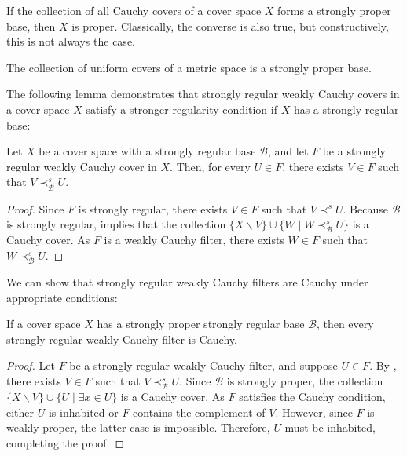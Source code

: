 \documentclass[reqno]{amsart}
\theoremstyle{definition}
\theoremstyle{remark}
\numberwithin{figure}{section}
\newcommand{\rb}{\prec}
\begin{document}
\begin{remark}
If the collection of all Cauchy covers of a cover space $X$ forms a strongly proper base, then $X$ is proper.
Classically, the converse is also true, but constructively, this is not always the case.
\end{remark}

\begin{example}
The collection of uniform covers of a metric space is a strongly proper base.
\end{example}

The following lemma demonstrates that strongly regular weakly Cauchy covers in a cover space $X$ satisfy a stronger regularity condition if $X$ has a strongly regular base:

\begin{lem}
Let $X$ be a cover space with a strongly regular base $\mathcal{B}$, and let $F$ be a strongly regular weakly Cauchy cover in $X$.
Then, for every $U \in F$, there exists $V \in F$ such that $V \rb^s_\mathcal{B} U$.
\end{lem}
\begin{proof}
Since $F$ is strongly regular, there exists $V \in F$ such that $V \rb^s U$.
Because $\mathcal{B}$ is strongly regular,  implies that the collection $\{ X \backslash V \} \cup \{ W \mid W \rb^s_\mathcal{B} U \}$ is a Cauchy cover.
As $F$ is a weakly Cauchy filter, there exists $W \in F$ such that $W \rb^s_\mathcal{B} U$.
\end{proof}

We can show that strongly regular weakly Cauchy filters are Cauchy under appropriate conditions:

\begin{prop}
If a cover space $X$ has a strongly proper strongly regular base $\mathcal{B}$, then every strongly regular weakly Cauchy filter is Cauchy.
\end{prop}
\begin{proof}
Let $F$ be a strongly regular weakly Cauchy filter, and suppose $U \in F$.
By , there exists $V \in F$ such that $V \rb^s_\mathcal{B} U$.
Since $\mathcal{B}$ is strongly proper, the collection $\{ X \backslash V \} \cup \{ U \mid \exists x \in U \}$ is a Cauchy cover.
As $F$ satisfies the Cauchy condition, either $U$ is inhabited or $F$ contains the complement of $V$.
However, since $F$ is weakly proper, the latter case is impossible.
Therefore, $U$ must be inhabited, completing the proof.
\end{proof}
\end{document}
